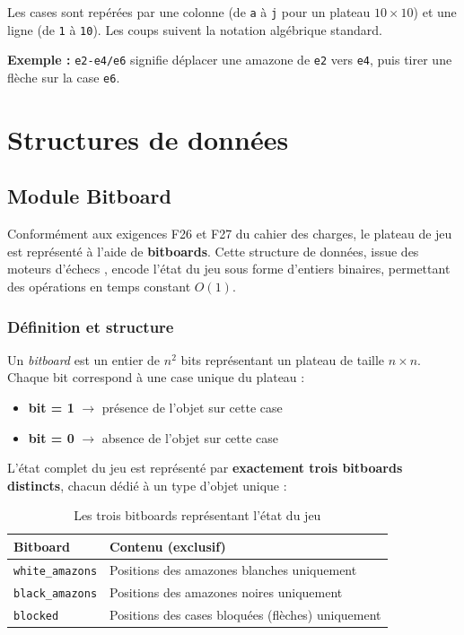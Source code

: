 \documentclass[a4paper]{article}
\begin{document}
Les cases sont repérées par une colonne (de \texttt{a} à \texttt{j} pour un plateau $10 \times 10$) et une ligne (de \texttt{1} à \texttt{10}).  
Les coups suivent la notation algébrique standard.

\textbf{Exemple :}  
\texttt{e2-e4/e6} signifie déplacer une amazone de \texttt{e2} vers \texttt{e4}, puis tirer une flèche sur la case \texttt{e6}.


\section{Structures de données}

\subsection{Module Bitboard}

Conformément aux exigences F26 et F27 du cahier des charges, le plateau de jeu est représenté à l'aide de \textbf{bitboards}. Cette structure de données, issue des moteurs d'échecs \cite{browne2014}, encode l'état du jeu sous forme d'entiers binaires, permettant des opérations en temps constant $O(1)$.

\subsubsection{Définition et structure}

Un \textit{bitboard} est un entier de $n^2$ bits représentant un plateau de taille $n \times n$. Chaque bit correspond à une case unique du plateau :
\begin{itemize}[noitemsep]
    \item \textbf{bit = 1} $\rightarrow$ présence de l'objet sur cette case
    \item \textbf{bit = 0} $\rightarrow$ absence de l'objet sur cette case
\end{itemize}

L'état complet du jeu est représenté par \textbf{exactement trois bitboards distincts}, chacun dédié à un type d'objet unique :

\begin{table}[H]
\centering
\begin{tabular}{lp{9cm}}
\toprule
\textbf{Bitboard} & \textbf{Contenu (exclusif)} \\
\midrule
\texttt{white\_amazons} & Positions des amazones blanches uniquement \\
\texttt{black\_amazons} & Positions des amazones noires uniquement \\
\texttt{blocked} & Positions des cases bloquées (flèches) uniquement \\
\bottomrule
\end{tabular}
\caption{Les trois bitboards représentant l'état du jeu}
\end{table}
\end{document}
